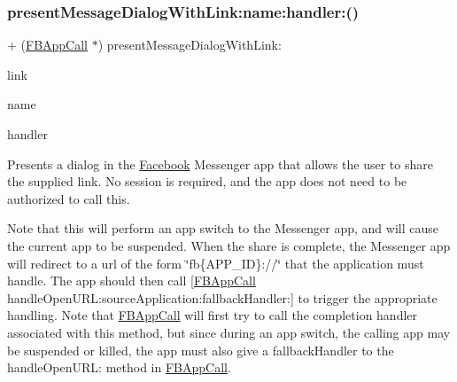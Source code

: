\subsubsection{\texorpdfstring{present\+Message\+Dialog\+With\+Link\+:name\+:handler\+:()}{presentMessageDialogWithLink:name:handler:()}\hspace{0.1cm}{\footnotesize\ttfamily [2/5]}}
{\footnotesize\ttfamily + (\hyperlink{interfaceFBAppCall}{F\+B\+App\+Call} $\ast$) present\+Message\+Dialog\+With\+Link\+: \begin{DoxyParamCaption}\item[{(N\+S\+U\+RL $\ast$)}]{link }\item[{name:(N\+S\+String $\ast$)}]{name }\item[{handler:(F\+B\+Dialog\+App\+Call\+Completion\+Handler)}]{handler }\end{DoxyParamCaption}}

Presents a dialog in the \hyperlink{interfaceFacebook}{Facebook} Messenger app that allows the user to share the supplied link. No session is required, and the app does not need to be authorized to call this.

Note that this will perform an app switch to the Messenger app, and will cause the current app to be suspended. When the share is complete, the Messenger app will redirect to a url of the form \char`\"{}fb\{\+A\+P\+P\+\_\+\+I\+D\}\+://\char`\"{} that the application must handle. The app should then call \mbox{[}\hyperlink{interfaceFBAppCall}{F\+B\+App\+Call} handle\+Open\+U\+R\+L\+:source\+Application\+:fallback\+Handler\+:\mbox{]} to trigger the appropriate handling. Note that \hyperlink{interfaceFBAppCall}{F\+B\+App\+Call} will first try to call the completion handler associated with this method, but since during an app switch, the calling app may be suspended or killed, the app must also give a fallback\+Handler to the handle\+Open\+U\+RL\+: method in \hyperlink{interfaceFBAppCall}{F\+B\+App\+Call}.


